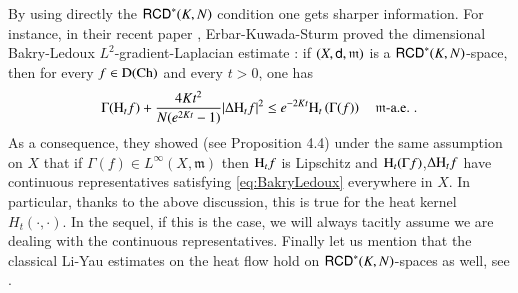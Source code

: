 \documentclass[11pt,reqno]{amsart}
\newcommand{\Ch}{{\rm Ch}}
\newcommand{\dom}{\rm D}
\newcommand{\mm}{\mathfrak m}
\newcommand{\sfd}{{\sf d}}
\renewcommand{\H}{{\rm H}}
\renewcommand{\d}{{\rm{d}}}
\newcommand{\RCD}{{\sf RCD}}
\theoremstyle{definition}
\theoremstyle{remark}
\theoremstyle{remark}
\theoremstyle{remark}
\theoremstyle{remark}
\theoremstyle{remark}
\theoremstyle{remark}
\theoremstyle{remark}
\begin{document}

By using directly the $\RCD^*(K,N)$ condition one gets sharper information. For instance, in their  recent paper \cite[Theorem 4.3]{EKS2013}, Erbar-Kuwada-Sturm proved the dimensional Bakry-Ledoux $L^2$-gradient-Laplacian estimate \cite{BakryLedoux}: if $(X,\sfd,\mm)$ is a $\RCD^*(K,N)$-space, then for every $f \in \dom(\Ch)$ and every $t>0$, one has
\begin{equation}\label{eq:BakryLedoux}
\Gamma(\H_t f)+\frac{4Kt^2}{N(e^{2Kt}-1)} |\Delta \H_t f|^2 \leq e^{-2Kt} \H_t\left( \Gamma(f)\right) \quad \mm\text{-a.e.} \; .
\end{equation}
As a consequence, they showed (see Proposition 4.4) under the same assumption on $X$ that if  $\Gamma(f)\in L^\infty(X,\mm)$ then $\H_t f$ is Lipschitz and $\H_t (\Gamma f)$,$\Delta \H_t f$ have continuous representatives satisfying \eqref{eq:BakryLedoux} everywhere in $X$. In particular, thanks to the above discussion, this is true for the heat kernel $H_t(\cdot,\cdot)$.  In the sequel, if this is the case, we will always tacitly assume we are dealing with the continuous representatives. Finally let us mention that the classical Li-Yau \cite{LY86} estimates on the heat flow hold on $\RCD^*(K,N)$-spaces as well, see \cite{GaMo}.
\end{document}
